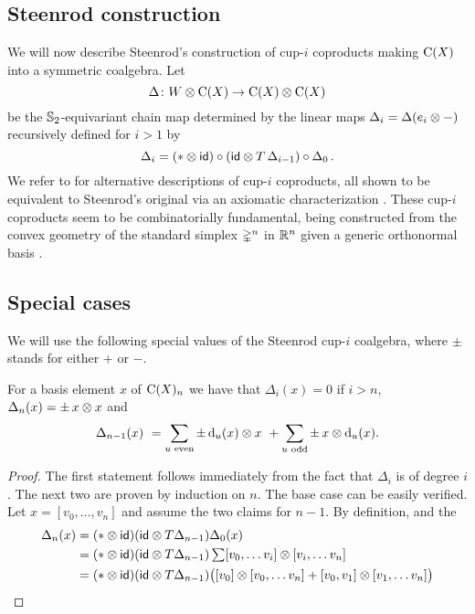 %	

\subsection{Steenrod construction} \label{ss:cup-i}

We will now describe Steenrod's construction of cup-$i$ coproducts \cite[p.293]{steenrod1947products} making $\operatorname{C}(X)$ into a symmetric coalgebra.
Let
\[
\Delta \colon W \otimes \operatorname{C}(X) \to \operatorname{C}(X) \otimes \operatorname{C}(X)
\]
be the $\mathbb{S}_2$-equivariant chain map determined by the linear maps $\Delta_i = \Delta(e_i \otimes -)$ recursively defined for $i > 1$ by
\begin{equation*} \label{e:cup-i coproducts}
	\operatorname{\Delta}_i =
	(\ast \otimes \mathsf{id}) \circ (\mathsf{id} \otimes T\operatorname{\Delta}_{i-1}) \circ \operatorname{\Delta}_0.
\end{equation*}
We refer to \cite{real1996computability, gonzalez-diaz1999steenrod, mcclure2003multivariable, medina2021fast_sq} for alternative descriptions of cup-$i$ coproducts, all shown to be equivalent to Steenrod's original via an axiomatic characterization \cite{medina2022axiomatic}.
These cup-$i$ coproducts seem to be combinatorially fundamental, being constructed from the convex geometry of the standard simplex $\mathbb{\Delta}^n$ in $\mathbb{R}^n$ given a generic orthonormal basis \cite{medina2022fib_poly}.

\subsection{Special cases}

We will use the following special values of the Steenrod cup-$i$ coalgebra, where $\pm$ stands for either $+$ or $-$.

\begin{lemma*}
	For a basis element $x$ of $\operatorname{C}(X)_n$ we have that $\Delta_i(x) = 0$ if $i > n$, $\Delta_n(x) = \pm \, x \otimes x$ and
	\[
	\Delta_{n-1}(x) \ =
	\sum_{u \text{ even}} \pm \operatorname{d}_u(x) \otimes x \ +
	\sum_{u \text{ odd}} \pm \, x \otimes \operatorname{d}_u(x).
	\]
\end{lemma*}
\begin{proof}
	The first statement follows immediately from the fact that $\Delta_i$ is of degree $i$.
	The next two are proven by induction on $n$.
	The base case can be easily verified.
	Let $x = [v_0, \dots, v_n]$ and assume the two claims for $n-1$.
	By definition, and the
	\begin{align*}
		\Delta_n(x) &=
		(\ast \otimes \mathsf{id}) (\mathsf{id} \otimes T \Delta_{n-1}) \Delta_0 (x) \\ &=
		(\ast \otimes \mathsf{id}) (\mathsf{id} \otimes T \Delta_{n-1}) \textstyle\sum [v_0, \dots v_i] \otimes [v_i, \dots v_n] \\ &=
		(\ast \otimes \mathsf{id}) (\mathsf{id} \otimes T \Delta_{n-1}) \big( [v_0] \otimes [v_0, \dots v_n] + [v_0, v_1] \otimes [v_1, \dots v_n]\big)
	\end{align*}


\end{proof}

